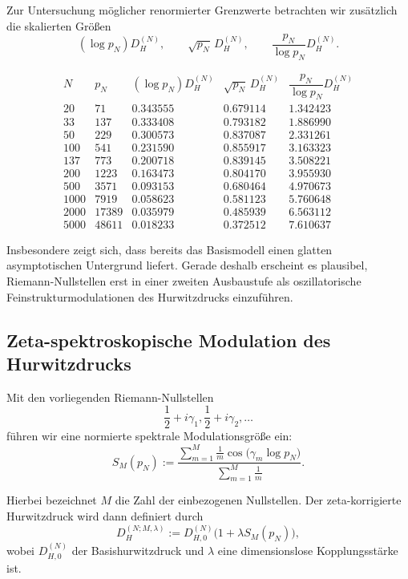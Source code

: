 \documentclass[12pt,a4paper]{article}
\theoremstyle{definition}
\begin{document}
	Zur Untersuchung möglicher renormierter Grenzwerte betrachten wir zusätzlich die skalierten Größen
	\[
	(\log p_N)D_H^{(N)},\qquad \sqrt{p_N}\,D_H^{(N)},\qquad \frac{p_N}{\log p_N}D_H^{(N)}.
	\]
	
	\[
	\begin{array}{r|r|r|r|r}
		N & p_N & (\log p_N)D_H^{(N)} & \sqrt{p_N}\,D_H^{(N)} & \dfrac{p_N}{\log p_N}D_H^{(N)} \\
		\hline
		20   & 71    & 0.343555 & 0.679114 & 1.342423 \\
		33   & 137   & 0.333408 & 0.793182 & 1.886990 \\
		50   & 229   & 0.300573 & 0.837087 & 2.331261 \\
		100  & 541   & 0.231590 & 0.855917 & 3.163323 \\
		137  & 773   & 0.200718 & 0.839145 & 3.508221 \\
		200  & 1223  & 0.163473 & 0.804170 & 3.955930 \\
		500  & 3571  & 0.093153 & 0.680464 & 4.970673 \\
		1000 & 7919  & 0.058623 & 0.581123 & 5.760648 \\
		2000 & 17389 & 0.035979 & 0.485939 & 6.563112 \\
		5000 & 48611 & 0.018233 & 0.372512 & 7.610637
	\end{array}
	\]
	
	Insbesondere zeigt sich, dass bereits das Basismodell einen glatten asymptotischen Untergrund liefert. Gerade deshalb erscheint es plausibel, Riemann-Nullstellen erst in einer zweiten Ausbaustufe als oszillatorische Feinstrukturmodulationen des Hurwitzdrucks einzuführen.
	
	\subsection{Zeta-spektroskopische Modulation des Hurwitzdrucks}
	
	Mit den vorliegenden Riemann-Nullstellen
	\[
	\frac12+i\gamma_1,\frac12+i\gamma_2,\dots
	\]
	führen wir eine normierte spektrale Modulationsgröße ein:
	\[
	S_M(p_N)
	:=
	\frac{\displaystyle\sum_{m=1}^{M}\frac{1}{m}\cos\!\bigl(\gamma_m\log p_N\bigr)}
	{\displaystyle\sum_{m=1}^{M}\frac{1}{m}}.
	\]
	
	Hierbei bezeichnet \(M\) die Zahl der einbezogenen Nullstellen. Der zeta-korrigierte Hurwitzdruck wird dann definiert durch
	\[
	D_H^{(N;M,\lambda)}
	:=
	D_{H,0}^{(N)}\bigl(1+\lambda S_M(p_N)\bigr),
	\]
	wobei \(D_{H,0}^{(N)}\) der Basishurwitzdruck und \(\lambda\) eine dimensionslose Kopplungsstärke ist.
	
\end{document}
